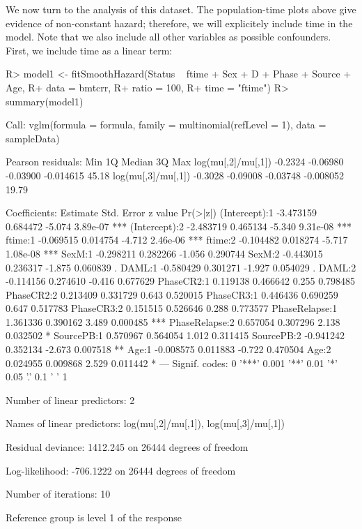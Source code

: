 \documentclass[article]{jss}
\begin{document}
We now turn to the analysis of this dataset. The population-time plots
above give evidence of non-constant hazard; therefore, we will
explicitely include time in the model. Note that we also include all
other variables as possible confounders. First, we include time as a
linear term:

\begin{CodeChunk}

\begin{CodeInput}
R> model1 <- fitSmoothHazard(Status ~ ftime + Sex + D + Phase + Source + Age, 
R+                           data = bmtcrr, 
R+                           ratio = 100,
R+                           time = "ftime")
R> summary(model1)
\end{CodeInput}

\begin{CodeOutput}

Call:
vglm(formula = formula, family = multinomial(refLevel = 1), data = sampleData)


Pearson residuals:
                       Min       1Q   Median        3Q   Max
log(mu[,2]/mu[,1]) -0.2324 -0.06980 -0.03900 -0.014615 45.18
log(mu[,3]/mu[,1]) -0.3028 -0.09008 -0.03748 -0.008052 19.79

Coefficients: 
                Estimate Std. Error z value Pr(>|z|)    
(Intercept):1  -3.473159   0.684472  -5.074 3.89e-07 ***
(Intercept):2  -2.483719   0.465134  -5.340 9.31e-08 ***
ftime:1        -0.069515   0.014754  -4.712 2.46e-06 ***
ftime:2        -0.104482   0.018274  -5.717 1.08e-08 ***
SexM:1         -0.298211   0.282266  -1.056 0.290744    
SexM:2         -0.443015   0.236317  -1.875 0.060839 .  
DAML:1         -0.580429   0.301271  -1.927 0.054029 .  
DAML:2         -0.114156   0.274610  -0.416 0.677629    
PhaseCR2:1      0.119138   0.466642   0.255 0.798485    
PhaseCR2:2      0.213409   0.331729   0.643 0.520015    
PhaseCR3:1      0.446436   0.690259   0.647 0.517783    
PhaseCR3:2      0.151515   0.526646   0.288 0.773577    
PhaseRelapse:1  1.361336   0.390162   3.489 0.000485 ***
PhaseRelapse:2  0.657054   0.307296   2.138 0.032502 *  
SourcePB:1      0.570967   0.564054   1.012 0.311415    
SourcePB:2     -0.941242   0.352134  -2.673 0.007518 ** 
Age:1          -0.008575   0.011883  -0.722 0.470504    
Age:2           0.024955   0.009868   2.529 0.011442 *  
---
Signif. codes:  0 '***' 0.001 '**' 0.01 '*' 0.05 '.' 0.1 ' ' 1

Number of linear predictors:  2 

Names of linear predictors: log(mu[,2]/mu[,1]), log(mu[,3]/mu[,1])

Residual deviance: 1412.245 on 26444 degrees of freedom

Log-likelihood: -706.1222 on 26444 degrees of freedom

Number of iterations: 10 

Reference group is level  1  of the response
\end{CodeOutput}
\end{CodeChunk}
\end{document}
